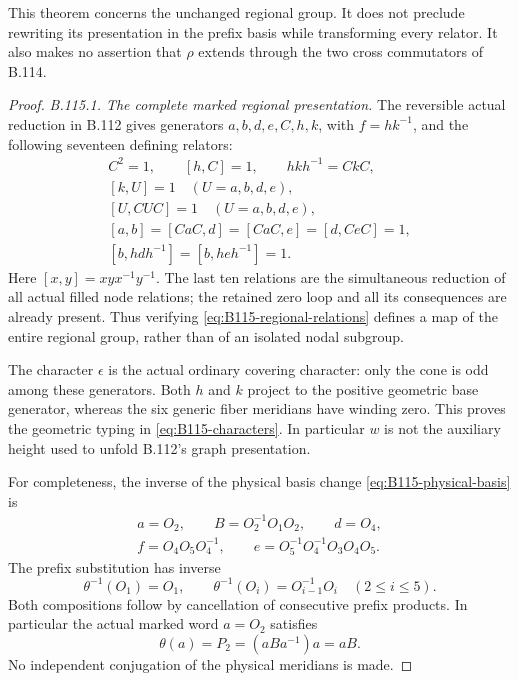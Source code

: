 This theorem concerns the unchanged regional group. It does not
preclude rewriting its presentation in the prefix basis while
transforming every relator. It also makes no assertion that $\rho$
extends through the two cross commutators of B.114.

\begin{proof}
\emph{B.115.1. The complete marked regional presentation.}
The reversible actual reduction in B.112 gives generators
$a,b,d,e,C,h,k$, with $f=hk^{-1}$, and the following seventeen
defining relators:
\begin{equation}\label{eq:B115-regional-relations}
 \begin{gathered}
 C^2=1,\qquad [h,C]=1,\qquad hkh^{-1}=CkC,\\
 [k,U]=1\quad(U=a,b,d,e),\\
 [U,CUC]=1\quad(U=a,b,d,e),\\
 [a,b]=[CaC,d]=[CaC,e]=[d,CeC]=1,\\
 [b,hdh^{-1}]=[b,heh^{-1}]=1.
 \end{gathered}
\end{equation}
Here $[x,y]=xyx^{-1}y^{-1}$. The last ten relations are the
simultaneous reduction of all actual filled node relations; the
retained zero loop and all its consequences are already present.
Thus verifying \eqref{eq:B115-regional-relations} defines a map of
the entire regional group, rather than of an isolated nodal subgroup.

The character $\epsilon$ is the actual ordinary covering character:
only the cone is odd among these generators. Both $h$ and $k$ project
to the positive geometric base generator, whereas the six generic
fiber meridians have winding zero. This proves the geometric typing
in \eqref{eq:B115-characters}. In particular $w$ is not the auxiliary
height used to unfold B.112's graph presentation.

For completeness, the inverse of the physical basis change
\eqref{eq:B115-physical-basis} is
\begin{equation}\label{eq:B115-physical-inverse}
 \begin{gathered}
 a=O_2,\qquad B=O_2^{-1}O_1O_2,\qquad d=O_4,\\
 f=O_4O_5O_4^{-1},\qquad
 e=O_5^{-1}O_4^{-1}O_3O_4O_5.
 \end{gathered}
\end{equation}
The prefix substitution has inverse
\[
 \theta^{-1}(O_1)=O_1,\qquad
 \theta^{-1}(O_i)=O_{i-1}^{-1}O_i\quad(2\leq i\leq5).
\]
Both compositions follow by cancellation of consecutive prefix
products. In particular the actual marked word $a=O_2$ satisfies
\begin{equation}\label{eq:B115-theta-a}
 \theta(a)=P_2=(aBa^{-1})a=aB.
\end{equation}
No independent conjugation of the physical meridians is made.


\end{proof}
